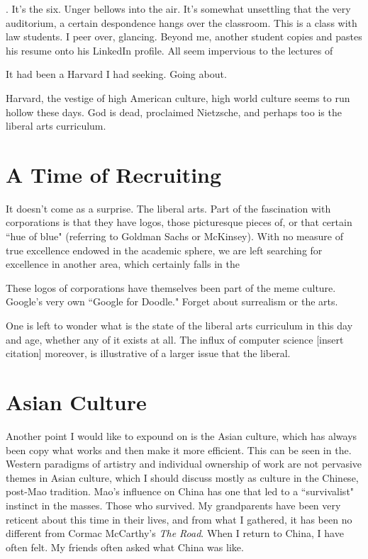 \documentclass[12pt,letterpaper]{article}
\begin{document}
.   It's the six.  Unger bellows into the air.  It's somewhat unsettling that the very auditorium, a certain despondence hangs over the classroom.  This is a class with law students.  I peer over, glancing.  Beyond me, another student copies and pastes his resume onto his LinkedIn profile.  All seem impervious to the lectures of 

It had been a Harvard I had seeking.  Going about.

Harvard, the vestige of high American culture, high world culture seems to run hollow these days.  God is dead, proclaimed Nietzsche, and perhaps too is the liberal arts curriculum.

\section{A Time of Recruiting}
It doesn't come as a surprise.  The liberal arts.  Part of the fascination with corporations is that they have logos, those picturesque pieces of, or that certain ``hue of blue" (referring to Goldman Sachs or McKinsey).  With no measure of true excellence endowed in the academic sphere, we are left searching for excellence in another area, which certainly falls in the 

These logos of corporations have themselves been part of the meme culture.  Google's very own ``Google for Doodle."  Forget about surrealism or the arts.

One is left to wonder what is the state of the liberal arts curriculum in this day and age, whether any of it exists at all.  The influx of computer science [insert citation] moreover, is illustrative of a larger issue that the liberal.

\section{Asian Culture}
Another point I would like to expound on is the Asian culture, which has always been copy what works and then make it more efficient.  This can be seen in the.  Western paradigms of artistry and individual ownership of work are not pervasive themes in Asian culture, which I should discuss mostly as culture in the Chinese, post-Mao tradition.  Mao's influence on China has one that led to a ``survivalist" instinct in the masses.  Those who survived.  My grandparents have been very reticent about this time in their lives, and from what I gathered, it has been no different from Cormac McCarthy's \textit{The Road}.  When I return to China, I have often felt.  My friends often asked what China was like.  
\end{document}
